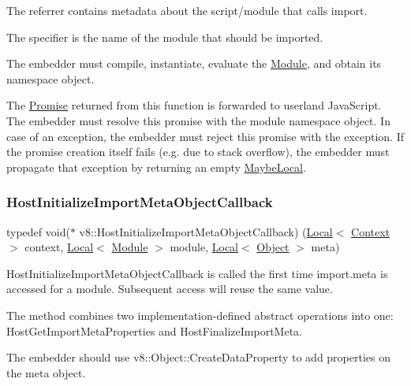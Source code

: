 The referrer contains metadata about the script/module that calls import.

The specifier is the name of the module that should be imported.

The embedder must compile, instantiate, evaluate the \mbox{\hyperlink{classv8_1_1Module}{Module}}, and obtain it\textquotesingle{}s namespace object.

The \mbox{\hyperlink{classv8_1_1Promise}{Promise}} returned from this function is forwarded to userland Java\+Script. The embedder must resolve this promise with the module namespace object. In case of an exception, the embedder must reject this promise with the exception. If the promise creation itself fails (e.\+g. due to stack overflow), the embedder must propagate that exception by returning an empty \mbox{\hyperlink{classv8_1_1MaybeLocal}{Maybe\+Local}}. \mbox{\label{namespacev8_a46fe0379312fafd495b9be892b2de443}} 
\subsubsection{\texorpdfstring{Host\+Initialize\+Import\+Meta\+Object\+Callback}{HostInitializeImportMetaObjectCallback}}
{\footnotesize\ttfamily typedef void($\ast$ v8\+::\+Host\+Initialize\+Import\+Meta\+Object\+Callback) (\mbox{\hyperlink{classv8_1_1Local}{Local}}$<$ \mbox{\hyperlink{classv8_1_1Context}{Context}} $>$ context, \mbox{\hyperlink{classv8_1_1Local}{Local}}$<$ \mbox{\hyperlink{classv8_1_1Module}{Module}} $>$ module, \mbox{\hyperlink{classv8_1_1Local}{Local}}$<$ \mbox{\hyperlink{classv8_1_1Object}{Object}} $>$ meta)}

Host\+Initialize\+Import\+Meta\+Object\+Callback is called the first time import.\+meta is accessed for a module. Subsequent access will reuse the same value.

The method combines two implementation-\/defined abstract operations into one\+: Host\+Get\+Import\+Meta\+Properties and Host\+Finalize\+Import\+Meta.

The embedder should use v8\+::\+Object\+::\+Create\+Data\+Property to add properties on the meta object. \mbox{\label{namespacev8_a967435db933fa9798caac467948499df}} 
